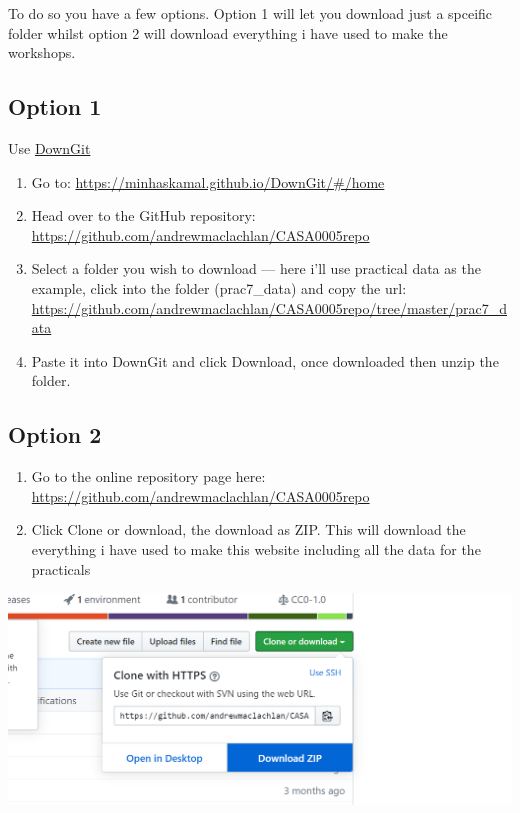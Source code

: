 \documentclass[
]{book}
\begin{document}
To do so you have a few options. Option 1 will let you download just a spceific folder whilst option 2 will download everything i have used to make the workshops.

\hypertarget{option-1}{%
\subsection*{Option 1}\label{option-1}}

Use \href{https://minhaskamal.github.io/DownGit/\#/home}{DownGit}

\begin{enumerate}
\def\labelenumi{\arabic{enumi}.}
\item
  Go to: \url{https://minhaskamal.github.io/DownGit/\#/home}
\item
  Head over to the GitHub repository: \url{https://github.com/andrewmaclachlan/CASA0005repo}
\item
  Select a folder you wish to download --- here i'll use practical data as the example, click into the folder (prac7\_data) and copy the url: \url{https://github.com/andrewmaclachlan/CASA0005repo/tree/master/prac7_data}
\item
  Paste it into DownGit and click Download, once downloaded then unzip the folder.
\end{enumerate}

\hypertarget{option-2}{%
\subsection*{Option 2}\label{option-2}}

\begin{enumerate}
\def\labelenumi{\arabic{enumi}.}
\item
  Go to the online repository page here: \url{https://github.com/andrewmaclachlan/CASA0005repo}
\item
  Click Clone or download, the download as ZIP. This will download the everything i have used to make this website including all the data for the practicals
\end{enumerate}

\begin{center}\includegraphics[width=500pt]{index_images/downloadrepo} \end{center}
\end{document}

